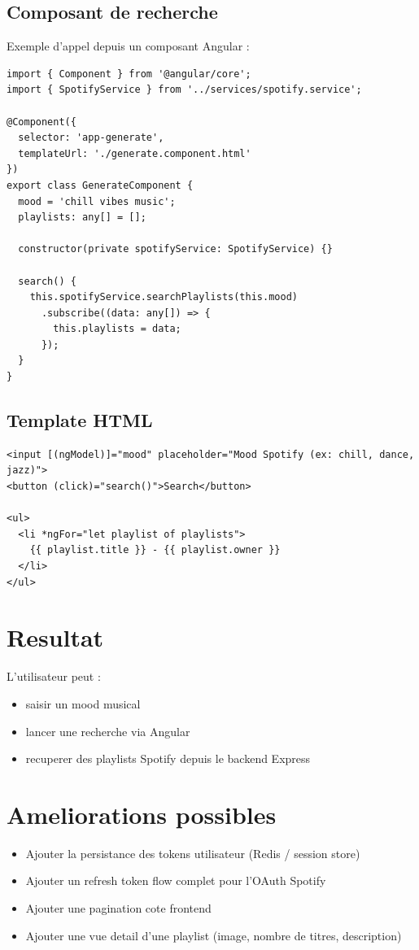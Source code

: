 \documentclass[a4paper,11pt]{article}
\begin{document}
\subsection{Composant de recherche}

Exemple d'appel depuis un composant Angular :

\begin{lstlisting}
import { Component } from '@angular/core';
import { SpotifyService } from '../services/spotify.service';

@Component({
  selector: 'app-generate',
  templateUrl: './generate.component.html'
})
export class GenerateComponent {
  mood = 'chill vibes music';
  playlists: any[] = [];

  constructor(private spotifyService: SpotifyService) {}

  search() {
    this.spotifyService.searchPlaylists(this.mood)
      .subscribe((data: any[]) => {
        this.playlists = data;
      });
  }
}
\end{lstlisting}

\subsection{Template HTML}

\begin{lstlisting}
<input [(ngModel)]="mood" placeholder="Mood Spotify (ex: chill, dance, jazz)">
<button (click)="search()">Search</button>

<ul>
  <li *ngFor="let playlist of playlists">
    {{ playlist.title }} - {{ playlist.owner }}
  </li>
</ul>
\end{lstlisting}

\section{Resultat}

L'utilisateur peut :

\begin{itemize}
\item saisir un mood musical
\item lancer une recherche via Angular
\item recuperer des playlists Spotify depuis le backend Express
\end{itemize}

\section{Ameliorations possibles}

\begin{itemize}
\item Ajouter la persistance des tokens utilisateur (Redis / session store)
\item Ajouter un refresh token flow complet pour l'OAuth Spotify
\item Ajouter une pagination cote frontend
\item Ajouter une vue detail d'une playlist (image, nombre de titres, description)
\end{itemize}
\end{document}
